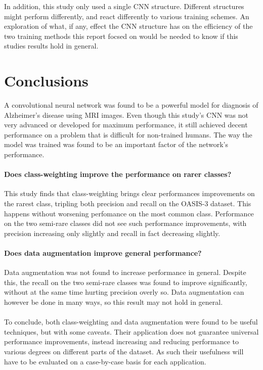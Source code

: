 \documentclass{kththesis}
\begin{document}
In addition, this study only used a single CNN structure. Different structures might perform differently, and react differently to various training schemes. An exploration of what, if any, effect the CNN structure has on the efficiency of the two training methods this report focsed on would be needed to know if this studies results hold in general.

\chapter{Conclusions}
A convolutional neural network was found to be a powerful model for diagnosis of Alzheimer’s disease using MRI images. Even though this study's CNN was not very advanced or developed for maximum performance, it still achieved decent performance on a problem that is difficult for non-trained humans. The way the model was trained was found to be an important factor of the network's performance.

\subsubsection{Does class-weighting improve the performance on rarer classes?}
This study finds that class-weighting brings clear performances improvements on the rarest class, tripling both precision and recall on the OASIS-3 dataset. This happens without worsening perfomance on the most common class. Performance on the two semi-rare classes did not see such performance improvements, with precision increasing only slightly and recall in fact decreasing slightly.

\subsubsection{Does data augmentation improve general performance?}
Data augmentation was not found to increase performance in general. Despite this, the recall on the two semi-rare classes was found to improve significantly, without at the same time hurting precision overly so. Data augmentation can however be done in many ways, so this result may not hold in general.

\subsubsection*{}
To conclude, both class-weighting and data augmentation were found to be useful techniques, but with some caveats. Their application does not guarantee universal performance improvements, instead increasing and reducing performance to various degrees on different parts of the dataset. As such their usefulness will have to be evaluated on a case-by-case basis for each application.
\end{document}
